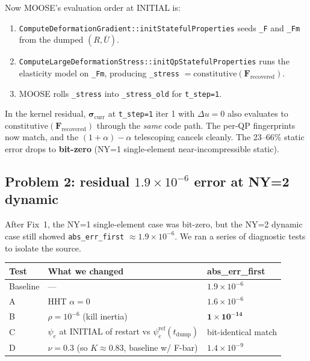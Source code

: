 \documentclass[11pt]{article}
\newcommand{\F}{\mathbf{F}}
\newcommand{\sig}{\boldsymbol{\sigma}}
\begin{document}
Now MOOSE's evaluation order at INITIAL is:
\begin{enumerate}
\item \texttt{ComputeDeformationGradient::initStatefulProperties} seeds \texttt{\_F} and \texttt{\_Fm} from the dumped $(R, \overline{U})$.
\item \texttt{ComputeLargeDeformationStress::initQpStatefulProperties} runs the elasticity model on \texttt{\_Fm}, producing \texttt{\_stress} $= \text{constitutive}(\F_{\text{recovered}})$.
\item MOOSE rolls \texttt{\_stress} into \texttt{\_stress\_old} for \texttt{t\_step=1}.
\end{enumerate}

In the kernel residual, $\sig_{\text{curr}}$ at \texttt{t\_step=1} iter 1 with $\Delta u = 0$ also evaluates to $\text{constitutive}(\F_{\text{recovered}})$ through the \emph{same} code path. The per-QP fingerprints now match, and the $(1+\alpha) - \alpha$ telescoping cancels cleanly. The 23--66\% static error drops to \textbf{bit-zero} (NY=1 single-element near-incompressible static).

\subsection{Problem 2: residual $1.9 \times 10^{-6}$ error at NY=2 dynamic}

After Fix~1, the NY=1 single-element case was bit-zero, but the NY=2 dynamic case still showed \texttt{abs\_err\_first} $\approx 1.9 \times 10^{-6}$. We ran a series of diagnostic tests to isolate the source.

\begin{center}
\begin{tabular}{lll}
\toprule
Test & What we changed & abs\_err\_first \\
\midrule
Baseline & --- & $1.9 \times 10^{-6}$ \\
A & HHT $\alpha = 0$ & $1.6 \times 10^{-6}$ \\
B & $\rho = 10^{-6}$ (kill inertia) & $\mathbf{1 \times 10^{-14}}$ \\
C & $\psi_e$ at INITIAL of restart vs $\psi_e^{\text{ref}}(t_{\text{dump}})$ & bit-identical match \\
D & $\nu = 0.3$ (so $K \approx 0.83$, baseline w/ F-bar) & $1.4 \times 10^{-9}$ \\
\bottomrule
\end{tabular}
\end{center}
\end{document}
